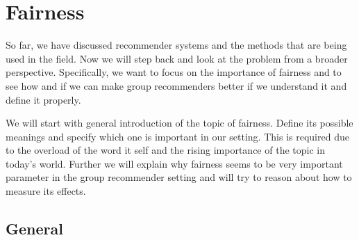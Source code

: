 \chapter{Fairness} \label{chap:fairness}

So far, we have discussed recommender systems and the methods that are being used in the field. Now we will step back and look at the problem from a broader perspective. Specifically, we want to focus on the importance of fairness and to see how and if we can make group recommenders better if we understand it and define it properly.

We will start with general introduction of the topic of fairness. Define its possible meanings and specify which one is important in our setting. This is required due to the overload of the word it self and the rising importance of the topic in today's world. Further we will explain why fairness seems to be very important parameter in the group recommender setting and will try to reason about how to measure its effects.

\newline
\newline
{}



\section{General} \label{sec:02_general}




